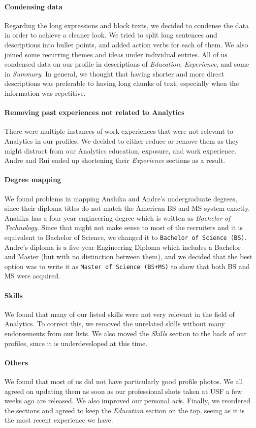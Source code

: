 \documentclass[]{article}
\let\oldparagraph\paragraph
\renewcommand{\paragraph}[1]{\oldparagraph{#1}\mbox{}}
\begin{document}
\paragraph{Condensing data}
Regarding the long expressions and block texts, we decided to condense the data in order to achieve a cleaner look. We tried to split long sentences and descriptions into bullet points, and added action verbs for each of them. We also joined some recurring themes and ideas under individual entries. All of us condensed data on our profile in descriptions of \textit{Education}, \textit{Experience}, and some in \textit{Summary}. In general, we thought that having shorter and more direct descriptions was preferable to having long chunks of text, especially when the information was repetitive.

\paragraph{Removing past experiences not related to Analytics}
There were multiple instances of work experiences that were not relevant to Analytics in our profiles. We decided to either reduce or remove them as they might distract from our Analytics education, exposure, and work experience. Andre and Rui ended up shortening their \textit{Experience} sections as a result.

\paragraph{Degree mapping}
We found problems in mapping  Anshika and Andre's undergraduate degrees, since their diploma titles do not match the American BS and MS system exactly. Anshika has a four year engineering degree which is written as \textit{Bachelor of Technology}. Since that might not make sense to most of the recruiters and it is equivalent to Bachelor of Science, we changed it to \texttt{Bachelor of Science (BS)}. Andre's diploma is a five-year Engineering Diploma which includes a Bachelor and Master (but with no distinction between them), and we decided that the best option was to write it as \texttt{Master of Science (BS+MS)} to show that both BS and MS were acquired. 

\paragraph{Skills}
We found that many of our listed skills were not very relevant in the field of Analytics. To correct this, we removed the unrelated skills without many endorsements from our lists. We also moved the \textit{Skills} section to the back of our profiles, since it is underdeveloped at this time.

\paragraph{Others}
We found that most of us did not have particularly good profile photos. We all agreed on updating them as soon as our professional shots taken at USF a few weeks ago are released. We also improved our personal \textit{url}s. Finally, we reordered the sections and agreed to keep the \textit{Education} section on the top, seeing as it is the most recent experience we have.
\end{document}

